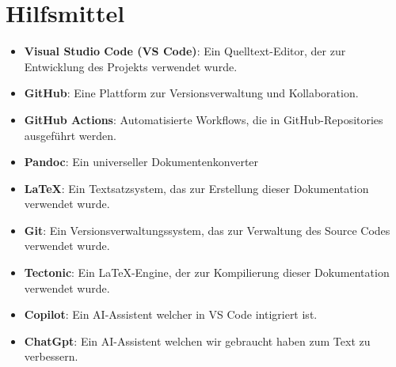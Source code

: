 \section*{Hilfsmittel}
\begin{itemize}
    \item \textbf{Visual Studio Code (VS Code)}: Ein Quelltext-Editor, der zur Entwicklung des Projekts verwendet wurde.
    \item \textbf{GitHub}: Eine Plattform zur Versionsverwaltung und Kollaboration.
    \item \textbf{GitHub Actions}: Automatisierte Workflows, die in GitHub-Repositories ausgeführt werden.
    \item \textbf{Pandoc}: Ein universeller Dokumentenkonverter
    \item \textbf{LaTeX}: Ein Textsatzsystem, das zur Erstellung dieser Dokumentation verwendet wurde.
    \item \textbf{Git}: Ein Versionsverwaltungssystem, das zur Verwaltung des Source Codes verwendet wurde.
    \item \textbf{Tectonic}: Ein LaTeX-Engine, der zur Kompilierung dieser Dokumentation verwendet wurde.
    \item \textbf{Copilot}: Ein AI-Assistent welcher in VS Code intigriert ist.
    \item \textbf{ChatGpt}: Ein AI-Assistent welchen wir gebraucht haben zum Text zu verbessern.
\end{itemize}